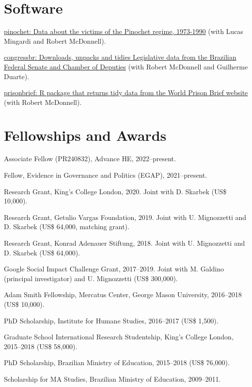\documentclass[a4paper]{article}
\renewenvironment{itemize}{
	\begin{list}{}{
			\setlength{\leftmargin}{1.5em}
		}
		}{
	\end{list}
}
\begin{document}
\section*{Software}

\begin{itemize}
  \item \href{http://danilofreire.github.io/pinochet}{pinochet: Data about the victims of the Pinochet regime, 1973-1990} (with Lucas Mingardi and Robert McDonnell).
  \item \href{https://github.com/RobertMyles/congressbr}{congressbr: Downloads, unpacks and tidies Legislative data from the Brazilian Federal Senate and Chamber of Deputies} (with Robert McDonnell and Guilherme Duarte).
  \item \href{http://danilofreire.github.io/prisonbrief}{prisonbrief: R package that returns tidy data from the World Prison Brief website} (with Robert McDonnell).
\end{itemize}

\section*{Fellowships and Awards}

\begin{itemize}
\item Associate Fellow (PR240832), Advance HE, 2022--present.
\item Fellow, Evidence in Governance and Politics (EGAP), 2021--present.
\item Research Grant, King's College London, 2020. Joint with D. Skarbek (US\$ 10,000).
\item Research Grant, Getulio Vargas Foundation, 2019. Joint with U. Mignozzetti and D. Skarbek (US\$ 64,000, matching grant).
\item Research Grant, Konrad Adenauer Stiftung, 2018. Joint with U. Mignozzetti and D. Skarbek (US\$ 64,000).
\item Google Social Impact Challenge Grant, 2017--2019. Joint with M. Galdino (principal investigator) and U. Mignozzetti (US\$ 300,000).
\item Adam Smith Fellowship, Mercatus Center, George Mason University, 2016--2018 (US\$ 10,000).
\item PhD Scholarship, Institute for Humane Studies, 2016--2017 (US\$ 1,500).
\item Graduate School International Research Studentship, King's College London, 2015--2018 (US\$ 58,000).
\item PhD Scholarship, Brazilian Ministry of Education, 2015--2018 (US\$ 76,000).
\item Scholarship for MA Studies, Brazilian Ministry of Education, 2009--2011.
\end{itemize}
\end{document}
